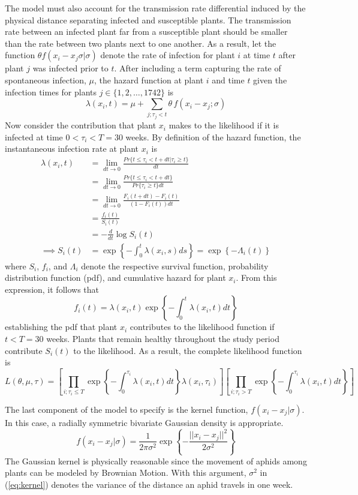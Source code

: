 \documentclass{uwstat572}
\begin{document}
The model must also account for the transmission rate differential induced by the physical distance separating infected and susceptible plants. 
The transmission rate between an infected plant far from a susceptible plant should be smaller than the rate between two plants next to one another.
As a result, let the function $\theta f(x_i -x_j \sigma | \sigma)$ denote the rate of infection for plant $i$ at time $t$ after plant $j$ was infected prior to $t$. 
After including a term capturing the rate of spontaneous infection, $\mu$, the hazard function at plant $i$ and time $t$ given the infection times for plants $j \in \{1, 2, \dots, 1742\}$ is 
$$\lambda(x_i,t) = \mu + \sum_{j; \tau_j<t} \theta \, f(x_i - x_j; \sigma)$$
Now consider the contribution that plant $x_i$ makes to the likelihood if it is infected at time $0<\tau_i<T=30$ weeks. 
By definition of the hazard function, the instantaneous infection rate at plant $x_i$ is
\begin{align*}
\lambda(x_i, t) &= \lim_{dt \to 0} \frac{Pr\{ t \le \tau_i < t+dt | \tau_i \ge t \}}{dt} \\
	&= \lim_{dt \to 0} \frac{Pr\{ t \le \tau_i < t+dt\}}{Pr\{\tau_i\ge t\}dt}\\
	&= \lim_{dt \to 0} \frac{F_i(t+dt) - F_i(t)}{(1-F_i(t))dt} \\
	&= \frac{f_i(t)}{S_i(t)}\\
	&= -\frac{d}{dt} \log S_i(t) \\
\implies S_i(t) &= \exp \left\{ - \int_0^t \lambda(x_i,s) ds  \right\} = \exp \left\{ - \Lambda_i(t)  \right\}
\end{align*}
where $S_i$, $f_i$, and $\Lambda_i$ denote the respective survival function, probability distribution function (pdf), and cumulative hazard for plant $x_i$. 
From this expression, it follows that
$$ f_i(t) = \lambda(x_i,t) \exp \left\{ - \int_0^t \lambda(x_i,t) dt  \right\}$$
establishing the pdf that plant $x_i$ contributes to the likelihood function if $t<T=30$ weeks. 
Plants that remain healthy throughout the study period contribute $S_i(t)$ to the likelihood. 
As a result, the complete likelihood function is
\begin{equation} 
L(\theta, \mu, \tau) = \left[ \prod_{i;\tau_i \le T} \exp \left\{-\int^{\tau_i}_0 \lambda(x_i, t)dt\right \} \lambda(x_i, \tau_i)\right] \left[ \prod_{i;\tau_i > T} \exp \left\{-\int^{\tau_i}_0 \lambda(x_i, t)dt \right\}\right] 
\end{equation}

The last component of the model to specify is the kernel function, $f(x_i -x_j | \sigma)$. 
In this case, a radially symmetric bivariate Gaussian density is appropriate. 
\begin{equation} f( x_i-x_j |\sigma) = \frac{1}{2\pi \sigma^2} \exp \left\{-\frac{ ||x_i-x_j||^2}{2\sigma^2} \right\} \label{eq:kernel} \end{equation}
The Gaussian kernel is physically reasonable since the movement of aphids among plants can be modeled by Brownian Motion. 
With this argument, $\sigma^2$ in (\ref{eq:kernel}) denotes the variance of the distance an aphid travels in one week. 
\end{document}
